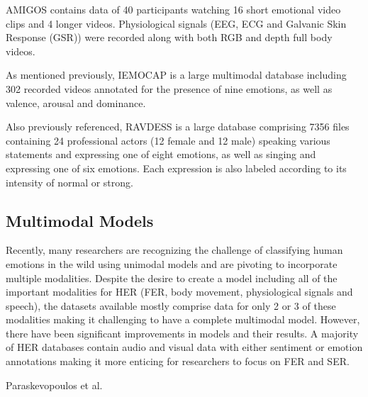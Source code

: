     AMIGOS \cite{miranda-correa} contains data of 40 participants watching 16 short emotional video clips and 4 longer videos. Physiological signals (EEG, ECG and Galvanic Skin Response (GSR)) were recorded along with both RGB and depth full body videos. 
    
    As mentioned previously, IEMOCAP is a large multimodal database including 302 recorded videos annotated for the presence of nine emotions, as well as valence, arousal and dominance. 
    
    Also previously referenced, RAVDESS \cite{livingstone_ryerson_2018} is a large database comprising 7356 files containing 24 professional actors (12 female and 12 male) speaking various statements and expressing one of eight emotions, as well as singing and expressing one of six emotions. Each expression is also labeled according to its intensity of normal or strong. 

\subsection{Multimodal Models}
    Recently, many researchers are recognizing the challenge of classifying human emotions in the wild using unimodal models and are pivoting to incorporate multiple modalities. Despite the desire to create a model including all of the important modalities for HER (FER, body movement, physiological signals and speech), the datasets available mostly comprise data for only 2 or 3 of these modalities making it challenging to have a complete multimodal model. However, there have been significant improvements in models and their results. A majority of HER databases contain audio and visual data with either sentiment or emotion annotations making it more enticing for researchers to focus on FER and SER. 

    Paraskevopoulos et al. \cite{paraskevopoulos-2022}
    

